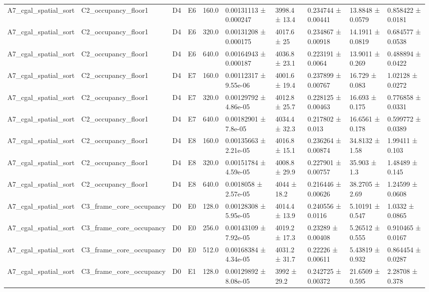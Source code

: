 \begin{table}
\begin{tabular}{llllllllll}
A7\_cgal\_spatial\_sort & C2\_occupancy\_floor1 & D4 & E6 & 160.0 & 0.00131113 ± 0.000247 & 3998.4 ± 13.4 & 0.234744 ± 0.00441 & 13.8848 ± 0.0579 & 0.858422 ± 0.0181 \\
A7\_cgal\_spatial\_sort & C2\_occupancy\_floor1 & D4 & E6 & 320.0 & 0.00131208 ± 0.000175 & 4017.6 ± 25 & 0.234867 ± 0.00918 & 14.1911 ± 0.0819 & 0.684577 ± 0.0538 \\
A7\_cgal\_spatial\_sort & C2\_occupancy\_floor1 & D4 & E6 & 640.0 & 0.00164943 ± 0.000187 & 4036.8 ± 23.1 & 0.223191 ± 0.0064 & 13.9011 ± 0.269 & 0.488894 ± 0.0422 \\
A7\_cgal\_spatial\_sort & C2\_occupancy\_floor1 & D4 & E7 & 160.0 & 0.00112317 ± 9.55e-06 & 4001.6 ± 19.4 & 0.237899 ± 0.00767 & 16.729 ± 0.083 & 1.02128 ± 0.0272 \\
A7\_cgal\_spatial\_sort & C2\_occupancy\_floor1 & D4 & E7 & 320.0 & 0.00129792 ± 4.86e-05 & 4012.8 ± 25.7 & 0.228125 ± 0.00463 & 16.693 ± 0.175 & 0.776858 ± 0.0331 \\
A7\_cgal\_spatial\_sort & C2\_occupancy\_floor1 & D4 & E7 & 640.0 & 0.00182901 ± 7.8e-05 & 4034.4 ± 32.3 & 0.217802 ± 0.013 & 16.6561 ± 0.178 & 0.599772 ± 0.0389 \\
A7\_cgal\_spatial\_sort & C2\_occupancy\_floor1 & D4 & E8 & 160.0 & 0.00135663 ± 2.21e-05 & 4016.8 ± 15.1 & 0.236264 ± 0.00874 & 34.8132 ± 1.58 & 1.99411 ± 0.103 \\
A7\_cgal\_spatial\_sort & C2\_occupancy\_floor1 & D4 & E8 & 320.0 & 0.00151784 ± 4.59e-05 & 4008.8 ± 29.9 & 0.227901 ± 0.00757 & 35.903 ± 1.3 & 1.48489 ± 0.145 \\
A7\_cgal\_spatial\_sort & C2\_occupancy\_floor1 & D4 & E8 & 640.0 & 0.0018058 ± 2.57e-05 & 4044 ± 18.2 & 0.216446 ± 0.00626 & 38.2705 ± 2.69 & 1.24599 ± 0.0608 \\
A7\_cgal\_spatial\_sort & C3\_frame\_core\_occupancy & D0 & E0 & 128.0 & 0.00128308 ± 5.95e-05 & 4014.4 ± 13.9 & 0.240556 ± 0.0116 & 5.10191 ± 0.547 & 1.0332 ± 0.0865 \\
A7\_cgal\_spatial\_sort & C3\_frame\_core\_occupancy & D0 & E0 & 256.0 & 0.00143109 ± 7.92e-05 & 4019.2 ± 17.3 & 0.23289 ± 0.00408 & 5.26512 ± 0.555 & 0.910465 ± 0.0167 \\
A7\_cgal\_spatial\_sort & C3\_frame\_core\_occupancy & D0 & E0 & 512.0 & 0.00168384 ± 4.34e-05 & 4031.2 ± 31.7 & 0.22226 ± 0.00611 & 5.43819 ± 0.932 & 0.864454 ± 0.0287 \\
A7\_cgal\_spatial\_sort & C3\_frame\_core\_occupancy & D0 & E1 & 128.0 & 0.00129892 ± 8.08e-05 & 3992 ± 29.2 & 0.242725 ± 0.00372 & 21.6509 ± 0.595 & 2.28708 ± 0.378 \\

\end{tabular}
\end{table}
